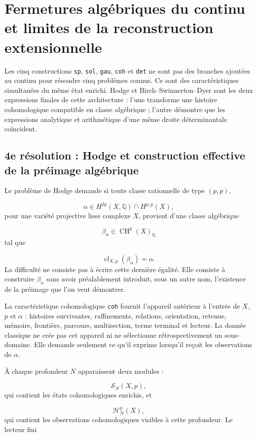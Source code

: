 \section{Fermetures algébriques du continu et limites de la reconstruction extensionnelle}
Les cinq constructions \texttt{sp}, \texttt{sol}, \texttt{gau}, \texttt{coh} et \texttt{det} ne sont pas des branches ajoutées au continu pour résoudre cinq problèmes connus. Ce sont des caractéristiques simultanées du même état enrichi. Hodge et Birch–Swinnerton–Dyer sont les deux expressions finales de cette architecture : l’une transforme une histoire cohomologique compatible en classe algébrique ; l’autre démontre que les expressions analytique et arithmétique d’une même droite déterminantale coïncident.\par
{}
\subsection{4e résolution : Hodge et construction effective de la préimage algébrique}
Le problème de Hodge demande si toute classe rationnelle de type \((p,p)\),\par
\[
\alpha\in
H^{2p}(X,\mathbb Q)\cap H^{p,p}(X),
\]
pour une variété projective lisse complexe \(X\), provient d’une classe algébrique\par
\[
\beta_\alpha\in \operatorname{CH}^{p}(X)_{\mathbb Q}
\]
tal que\par
\[
\operatorname{cl}_{X,p}(\beta_\alpha)=\alpha.
\]
La difficulté ne consiste pas à écrire cette dernière égalité. Elle consiste à construire \(\beta_\alpha\) sans avoir préalablement introduit, sous un autre nom, l’existence de la préimage que l’on veut démontrer.\par
La caractéristique cohomologique \texttt{coh} fournit l’appareil antérieur à l’entrée de \(X\), \(p\) et \(\alpha\) : histoires survivantes, raffinements, relations, orientation, retenue, mémoire, frontière, parcours, multisection, terme terminal et lecteur. La donnée classique ne crée pas cet appareil ni ne sélectionne rétrospectivement un sous-domaine. Elle demande seulement ce qu’il exprime lorsqu’il reçoit les observations de \(\alpha\).\par
À chaque profondeur \(N\) apparaissent deux modules :\par
\[
\mathscr S_N(X,p),
\]
qui contient les états cohomologiques enrichis, et\par
\[
\mathscr H_N^p(X),
\]
qui contient les observations cohomologiques visibles à cette profondeur. Le lecteur fini\par
